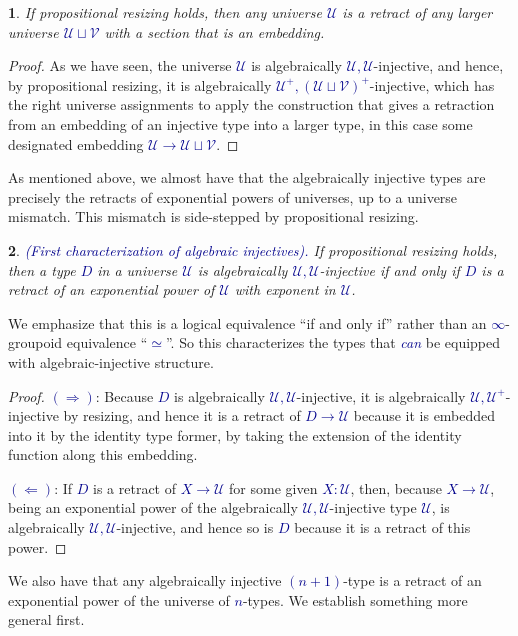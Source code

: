 \documentclass[10pt]{article}
\newcommand{\db}{\textcolor{darkblue}}
\newcommand{\df}[1]{\emph{\db{#1}}}
\newcommand{\m}[1]{\db{$#1$}}
\newcommand{\U}{\mathcal{U}}
\newcommand{\V}{\mathcal{V}}
\newtheorem{numbered}{}
\theoremstyle{definition}
\begin{document}
\begin{numbered}
  If propositional resizing holds, then any universe \m{\U} is a
  retract of any larger universe \m{\U \sqcup \V} with a section that
  is an embedding.
\end{numbered}
\begin{proof}
  As we have seen, the universe \m{\U} is algebraically
  \m{\U,\U}-injective, and hence, by propositional resizing, it is
  algebraically \m{\U^+,(\U \sqcup \V)^+}-injective, which has the
  right universe assignments to apply the construction that gives a
  retraction from an embedding of an injective type into a larger
  type, in this case some designated embedding \m{\U \to \U \sqcup
    \V}.
\end{proof}

As mentioned above, we almost have that the algebraically injective
types are precisely the retracts of exponential powers of universes,
up to a universe mismatch. This mismatch is side-stepped by
propositional resizing.

\begin{numbered} \df{(First characterization of algebraic
    injectives).}  If propositional resizing holds, then a type \m{D}
  in a universe \m{\U} is algebraically \m{\U,\U}-injective if and
  only if \m{D} is a retract of an exponential power of \m{\U} with
  exponent in \m{\U}.
\end{numbered}
\noindent We emphasize that this is a logical equivalence ``if and
only if'' rather than an \m{\infty}-groupoid equivalence
``\m{\simeq}''.  So this characterizes the types
  that \df{can} be equipped with algebraic-injective structure.
\begin{proof}
  \m{(\Rightarrow)}: Because \m{D} is algebraically
  \m{\U,\U}-injective, it is algebraically \m{\U,\U^+}-injective by
  resizing, and hence it is a retract of \m{D \to \U} because it is
  embedded into it by the identity type former, by taking the
  extension of the identity function along this embedding.

  \m{(\Leftarrow)}: If \m{D} is a retract of \m{X \to \U} for some
  given \m{X:\U}, then, because \m{X \to \U}, being an exponential
  power of the algebraically \m{\U ,\U}-injective type \m{\U}, is
  algebraically \m{\U,\U}-injective, and hence so is \m{D} because it
  is a retract of this power.
\end{proof}

We also have that any algebraically injective \m{(n+1)}-type is a retract
of an exponential power of the universe of \m{n}-types. We establish something
more general first.
\end{document}
